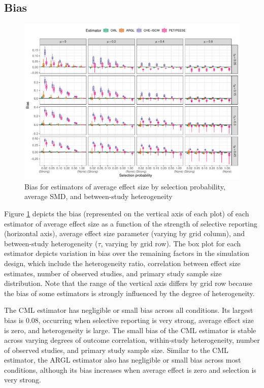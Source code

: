 \documentclass[
  american,
  man, donotrepeattitle,floatsintext]{apa7}
\begin{document}
\subsection{Bias}\label{bias}

\begin{figure}
\includegraphics{step-function-selection-models-with-dependent-effects_files/figure-latex/mu-bias-1} \caption{Bias for estimators of average effect size by selection probability, average SMD, and between-study heterogeneity}\label{fig:mu-bias}
\end{figure}

Figure \ref{fig:mu-bias} depicts the bias (represented on the vertical axis of each plot) of each estimator of average effect size as a function of the strength of selective reporting (horizontal axis), average effect size parameter (varying by grid column), and between-study heterogeneity (\(\tau\), varying by grid row).
The box plot for each estimator depicts variation in bias over the remaining factors in the simulation design, which include the heterogeneity ratio, correlation between effect size estimates, number of observed studies, and primary study sample size distribution.
Note that the range of the vertical axis differs by grid row because the bias of some estimators is strongly influenced by the degree of heterogeneity.

The CML estimator has negligible or small bias across all conditions.
Its largest bias is 0.08, occurring when selective reporting is very strong, average effect size is zero, and heterogeneity is large.
The small bias of the CML estimator is stable across varying degrees of outcome correlation, within-study heterogeneity, number of observed studies, and primary study sample size.
Similar to the CML estimator, the ARGL estimator also has negligible or small bias across most conditions, although its bias increases when average effect is zero and selection is very strong.
\end{document}

